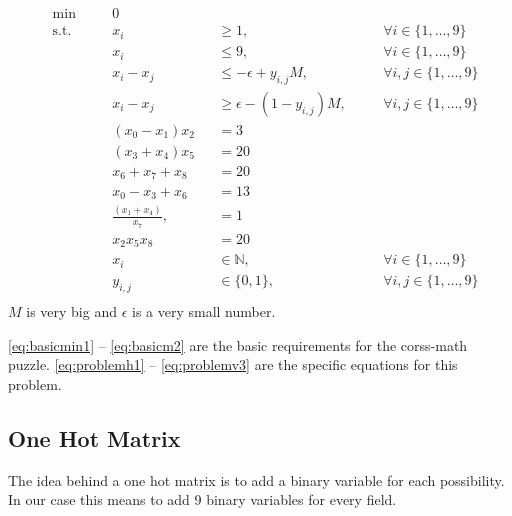 \documentclass[parskip=half]{scrartcl}
\newcommand{\onetonine}{\{1,\ldots,9\}}
\begin{document}
\begin{align}
&\min \quad &&0 \\
& \text{s.t.} \quad 
  && x_i 			&&\geq 1 		,&&\quad \forall i \in \onetonine \label{eq:basicmin1} \\
& && x_i 			&&\leq 9  		,&&\quad \forall i \in \onetonine \label{eq:basicmax9} \\
& && x_i - x_j 	&&\leq -\epsilon + y_{i,j} M ,&& \quad \forall i,j \in \onetonine \label{eq:basicm1}\\
& && x_i - x_j 	&&\geq \epsilon - (1-y_{i,j}) M ,&& \quad \forall i,j \in \onetonine \label{eq:basicm2}\\
& && (x_0 - x_1) x_2  &&= 3 \label{eq:problemh1} \\
& && (x_3 + x_4) x_5  &&= 20 \label{eq:problemh2} \\
& && x_6  + x_7 + x_8 &&= 20 \label{eq:problemh3} \\
& && x_0 - x_3 + x_6  &&= 13 \label{eq:problemv1} \\
& && \frac{(x_1 + x_4)}{x_7} ,&&= 1 \label{eq:problemv2} \\
& && x_2  x_5  x_8 &&= 20 \label{eq:problemv3} \\
& && x_i 		&&\in \mathbb{N}  ,&& \quad \forall i \in \onetonine \\
& && y_{i,j} 		&&\in \{0,1\} ,&& \quad \forall i,j \in \onetonine \\
\end{align}
$M$ is very big and $\epsilon$ is a very small number.

\autoref{eq:basicmin1} -- \autoref{eq:basicm2} are the basic requirements for the corss-math puzzle. \autoref{eq:problemh1} -- \autoref{eq:problemv3} are the specific equations for this problem.
\pagebreak
\subsection{One Hot Matrix}

The idea behind a one hot matrix is to add a binary variable for each possibility. In our case this means to add 9 binary variables for every field.
\end{document}
